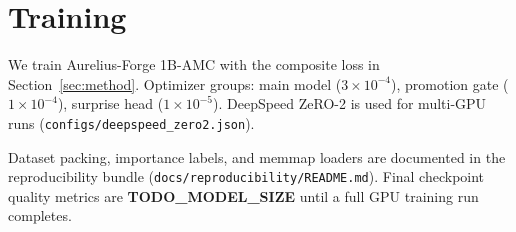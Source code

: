 \section{Training}
\label{sec:training}


We train Aurelius-Forge 1B-AMC with the composite loss in
Section~\ref{sec:method}. Optimizer groups: main model
($3\times10^{-4}$), promotion gate ($1\times10^{-4}$), surprise head
($1\times10^{-5}$). DeepSpeed ZeRO-2 is used for multi-GPU runs
(\texttt{configs/deepspeed\_zero2.json}).

Dataset packing, importance labels, and memmap loaders are documented in
the reproducibility bundle (\texttt{docs/reproducibility/README.md}).
Final checkpoint quality metrics are \textbf{TODO\_MODEL\_SIZE} until a
full GPU training run completes.
